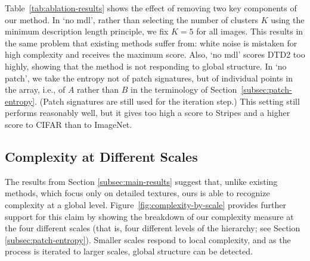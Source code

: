 \documentclass[a4paper,fleqn]{cas-sc}
\theoremstyle{remark}
\begin{document}
\begin{table}
\caption{Effect of removing two main components of our method. In `no mdl', clustering is performed without MDL, instead simply fixing the number of clusters to $5$ for all images and all scales. In `no patch', we compute the entropy of the clusters themselves rather than of the patch signatures.}
\label{tab:ablation-results}
\centering
{}
\end{table}

Table~\ref{tab:ablation-results} shows the effect of removing two key components of our method. In `no mdl', rather than selecting the number of clusters $K$ using the minimum description length principle, we fix $K=5$ for all images. This results in the same problem that existing methods suffer from: white noise is mistaken for high complexity and receives the maximum score. Also, `no mdl' scores DTD2 too highly, showing that the method is not responding to global structure. In `no patch', we take the entropy not of patch signatures, but of individual points in the array, i.e., of $A$ rather than $B$ in the terminology of Section~\ref{subsec:patch-entropy}. (Patch signatures are still used for the iteration step.) This setting still performs reasonably well, but it gives too high a score to Stripes and a higher score to CIFAR than to ImageNet. 


\subsection{Complexity at Different Scales} \label{subsec:complexity-at-scales}
The results from Section \ref{subsec:main-results} suggest that, unlike existing methods, which focus only on detailed textures, ours is able to recognize complexity at a global level. Figure~\ref{fig:complexity-by-scale} provides further support for this claim by showing the breakdown of our complexity measure at the four different scales (that is, four different levels of the hierarchy; see Section \ref{subsec:patch-entropy}). Smaller scales respond to local complexity, and as the process is iterated to larger scales, global structure can be detected.
\end{document}
